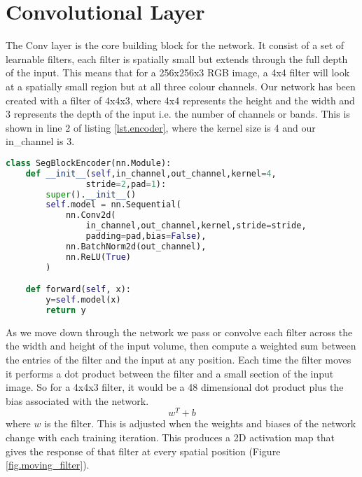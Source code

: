 \section{Convolutional Layer}
The Conv layer is the core building block for the network. It consist of a set of learnable filters, each filter is spatially small but extends through the full depth of the input. This means that for a 256x256x3 RGB image, a 4x4 filter will look at a spatially small region but at all three colour channels. Our network has been created with a filter of 4x4x3, where 4x4 represents the height and the width and 3 represents the depth of the input i.e. the number of channels or bands. This is shown in line 2 of listing \ref{lst.encoder}, where the kernel size is 4 and our in\_channel is 3. \par
\begin{lstlisting}[language=Python, caption = {Encoder architecture, performs the convolution on the input volume at each layer in the CNN. Input is a 3D volume of depth, height and width, where the initial depth is the number of channels in the input image. The encoder convolves the data by passing a moving filter of size 4x4, with a stride of 2 and a zero padding of 1, then a batch normalisation is performed and finally an activation function is applied.}, label={lst.encoder},float,floatplacement=htbp]
class SegBlockEncoder(nn.Module):
    def __init__(self,in_channel,out_channel,kernel=4,
                stride=2,pad=1):
        super().__init__()
        self.model = nn.Sequential(
            nn.Conv2d(
                in_channel,out_channel,kernel,stride=stride,
                padding=pad,bias=False),
            nn.BatchNorm2d(out_channel),
            nn.ReLU(True)
        )

    def forward(self, x):
        y=self.model(x)
        return y
\end{lstlisting}
As we move down through the network we pass or convolve each filter across the the width and height of the input volume, then compute a weighted sum between the entries of the filter and the input at any position. Each time the filter moves it performs a dot product between the filter and a small section of the input image. So for a 4x4x3 filter, it would be a 48 dimensional dot product plus the bias associated with the network. 
\[ w^T + b \] where $w$ is the filter.
This is adjusted when the weights and biases of the network change with each training iteration. This produces a 2D activation map that gives the response of that filter at every spatial position (Figure \ref{fig.moving_filter}). 
 
